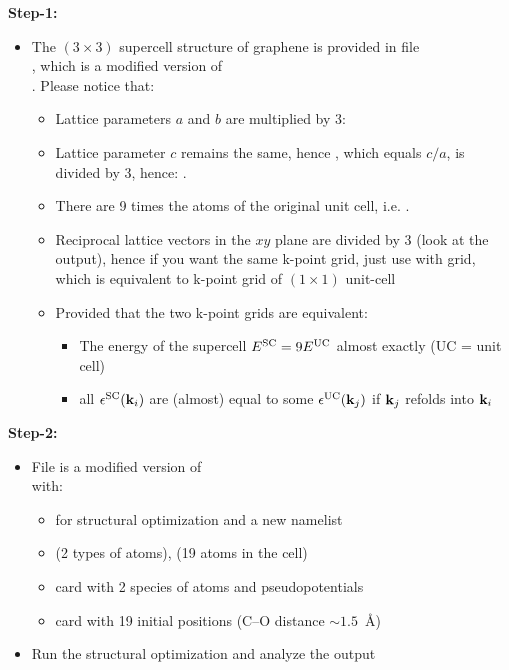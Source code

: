 \documentclass[landscape]{foils}
\begin{document}
{\bf Step-1:}
\vspace{-1em}
\begin{itemize}
\item The $(3\times3)$ supercell structure of
  graphene is provided in file\\
  , which is a modified version of\\
  . Please
  notice that:
  \begin{itemize}
  \item Lattice parameters $a$ and $b$ are multiplied by 3:
    \vspace{0.3em}
  \item Lattice parameter $c$ remains the same, hence ,
    which equals $c/a$, is divided by 3, hence: .
    \vspace{0.3em}
  \item There are 9 times the atoms of the original unit cell, i.e. .
    \vspace{0.3em}
  \item Reciprocal lattice vectors in the $xy$ plane are divided by 3
    (look at the output), hence if you want the same k-point grid,
    just use  with 
    grid, which is equivalent to  k-point grid of
    $(1\times1)$ unit-cell \vspace{0.3em}
  \item Provided that {\red the two k-point grids are equivalent}:
    \begin{itemize}
    \item
      The energy of the supercell $E^{\rm SC} = 9E^{\rm UC}$ almost exactly
      (UC = unit cell)
    \item
      all $\epsilon^{\rm SC}({\bf k}_i)$ are (almost) equal to some
      $\epsilon^{\rm UC}({\bf k}_j)$ if ${\bf k}_j$ refolds into ${\bf k}_i$
    \end{itemize}   
  \end{itemize}
\end{itemize}

{\bf Step-2:}
\vspace{-1em}
\begin{itemize}
\item File  is a modified version of\\
   with:
  \begin{itemize}  
  \item {} for structural optimization and a new
    namelist 
  \item {} (2 types of atoms), 
    (19 atoms in the cell)
  \item {} card with 2 species of atoms and
    pseudopotentials
  \item {} card with 19 initial positions
    (C--O distance $\sim 1.5$~\AA)
  \end{itemize}
\item Run the structural optimization and analyze the output
\end{itemize}
\end{document}
